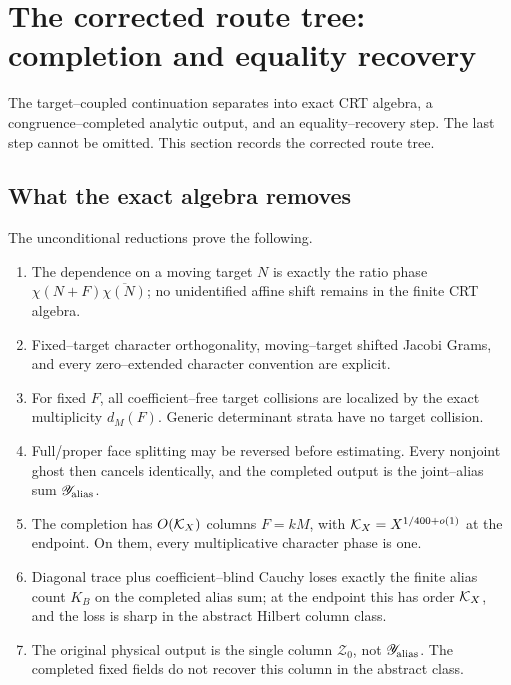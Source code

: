 \section{The corrected route tree: completion and equality recovery}
\label{sec:tpc38-next-gate}

The target--coupled continuation separates into exact CRT algebra, a
congruence--completed analytic output, and an equality--recovery step.  The
last step cannot be omitted.  This section records the corrected route
tree.

\subsection{What the exact algebra removes}

The unconditional reductions prove the following.

\begin{enumerate}[label=(\roman*)]
 \item The dependence on a moving target \(N\) is exactly the ratio phase
 \(\chi(N+F)\overline{\chi(N)}\); no unidentified affine shift remains in
 the finite CRT algebra.

 \item Fixed--target character orthogonality, moving--target shifted Jacobi
 Grams, and every zero--extended character convention are explicit.

 \item For fixed \(F\), all coefficient--free target collisions are
 localized by the exact multiplicity \(d_M(F)\).  Generic determinant
 strata have no target collision.

 \item Full/proper face splitting may be reversed before estimating.
 Every nonjoint ghost then cancels identically, and the completed output is
 the joint--alias sum \(\mathscr Y_{\rm alias}\).

 \item The completion has \(O(\mathcal K_X)\) columns \(F=kM\), with
 \(\mathcal K_X=X^{1/400+o(1)}\) at the endpoint.  On them, every
 multiplicative character phase is one.

 \item Diagonal trace plus coefficient--blind Cauchy loses exactly the
 finite alias count \(K_B\) on the completed alias sum; at the endpoint
 this has order \(\mathcal K_X\), and the loss is sharp in the abstract Hilbert
 column class.

 \item The original physical output is the single column
 \(\mathscr Z_0\), not \(\mathscr Y_{\rm alias}\).  The completed fixed
 fields do not recover this column in the abstract class.
\end{enumerate}

